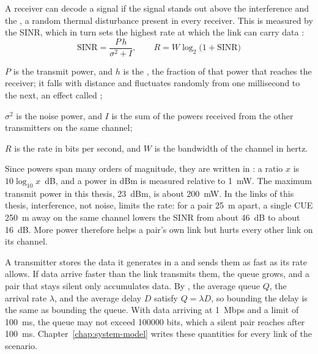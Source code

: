 A receiver can decode a signal if the signal stands out above the interference and the , a
random thermal disturbance present in every receiver. This is measured by the \ac{SINR}, which in turn sets
the highest rate at which the link can carry data \cite{shannon48communication}:
\begin{equation}
  \mathrm{SINR} = \frac{P\,h}{\sigma^2 + I}, \qquad R = W \log_2\bigl(1 + \mathrm{SINR}\bigr)
  \label{eq:bg-sinr}
\end{equation}
\begin{wherelist}
  \item $P$ is the transmit power, and $h$ is the , the fraction of that power that
    reaches the receiver; it falls with distance and fluctuates randomly from one millisecond to the next,
    an effect called ;
  \item $\sigma^2$ is the noise power, and $I$ is the sum of the powers received from the other transmitters
    on the same channel;
  \item $R$ is the rate in bits per second, and $W$ is the bandwidth of the channel in hertz.
\end{wherelist}
Since powers span many orders of magnitude, they are written in : a ratio $x$ is
$10 \log_{10} x$~dB, and a power in dBm is measured relative to \SI{1}{\milli\watt}. The maximum transmit
power in this thesis, \SI{23}{dBm}, is about \SI{200}{\milli\watt}. In the links of this thesis,
interference, not noise, limits the rate: for a pair \SI{25}{\meter} apart, a single \ac{CUE}
\SI{250}{\meter} away on the same channel lowers the \ac{SINR} from about \SI{46}{dB} to about
\SI{16}{dB}. More power therefore helps a pair's own link but hurts every other link on its channel.

A transmitter stores the data it generates in a  and sends them as fast as its rate allows.
If data arrive faster than the link transmits them, the queue grows, and a pair that stays silent only
accumulates data. By  \cite{little61queuing}, the average queue $Q$, the arrival rate
$\lambda$, and the average delay $D$ satisfy $Q = \lambda D$, so bounding the delay is the same as bounding
the queue. With data arriving at \SI{1}{Mbps} and a limit of \SI{100}{\milli\second}, the queue may not
exceed \num{100000} bits, which a silent pair reaches after \SI{100}{\milli\second}.
Chapter~\ref{chap:system-model} writes these quantities for every link of the scenario.

